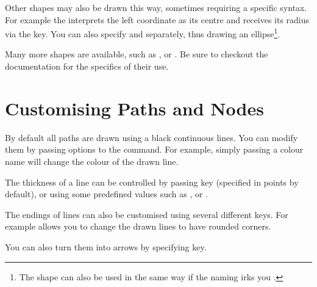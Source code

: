 Other shapes may also be drawn this way, sometimes requiring a specific syntax.
For example the  interprets the left coordinate as its centre and
receives its radius via the  key. You can also specify  and  separately, thus drawing an ellipse\footnote{The
   shape can also be used in the same way if the naming irks you
  \smiley.}.
\begin{example}[vertical_mode, examplewidth=0.9\linewidth]
\end{example}
Many more shapes are available, such as ,  or .
Be sure to checkout the documentation for the specifics of their use.

\section{Customising Paths and Nodes}

By default all paths are drawn using a black continuous lines. You can modify
them by passing options to the  command. For example, simply passing
a colour name will change the colour of the drawn line.
\begin{example}
\end{example}

The thickness of a line can be controlled by passing  key
(specified in points by default), or using some predefined values such as
,  or .
\begin{example}
\end{example}

The endings of lines can also be customised using several different keys. For
example  allows you to change the drawn lines to have rounded
corners.
\begin{example}
\end{example}
You can also turn them into arrows by specifying  key.
\begin{example}
\end{example}

